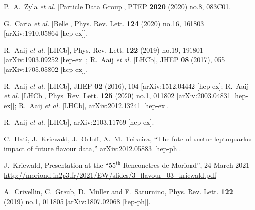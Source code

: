 \documentclass[a4paper,11pt]{article}
\begin{document}
\begin{thebibliography}{99}
{\small
P.~A.~Zyla \textit{et al.} [Particle Data Group],
PTEP \textbf{2020} (2020) no.8, 083C01.

G.~Caria \textit{et al.} [Belle],
Phys. Rev. Lett. \textbf{124} (2020) no.16, 161803
[arXiv:1910.05864 [hep-ex]].

R.~Aaij \textit{et al.} [LHCb],
Phys. Rev. Lett. \textbf{122} (2019) no.19, 191801
[arXiv:1903.09252 [hep-ex]];
R.~Aaij \textit{et al.} [LHCb],
JHEP \textbf{08} (2017), 055
[arXiv:1705.05802 [hep-ex]].


R.~Aaij \textit{et al.} [LHCb],
JHEP \textbf{02} (2016), 104
[arXiv:1512.04442 [hep-ex];
R.~Aaij \textit{et al.} [LHCb],
Phys. Rev. Lett. \textbf{125} (2020) no.1, 011802
[arXiv:2003.04831 [hep-ex]];
R.~Aaij \textit{et al.} [LHCb],
arXiv:2012.13241 [hep-ex].

R.~Aaij \textit{et al.} [LHCb],
arXiv:2103.11769 [hep-ex].

C.~Hati, J.~Kriewald, J.~Orloff, A.~M.~Teixeira, ``The fate of vector leptoquarks: impact of future flavour data,'' arXiv:2012.05883 [hep-ph].

J.~Kriewald,
Presentation at the ``$55^\text{th}$ Renconctres de Moriond'', 24 March 2021
\href{http://moriond.in2p3.fr/2021/EW/slides/3_flavour_03_kriewald.pdf}{http://moriond.in2p3.fr/2021/EW/slides/3\_flavour\_03\_kriewald.pdf}

A.~Crivellin, C.~Greub, D.~M\"uller and F.~Saturnino,
Phys. Rev. Lett. \textbf{122} (2019) no.1, 011805
[arXiv:1807.02068 [hep-ph]].

}
\end{thebibliography}
\end{document}
